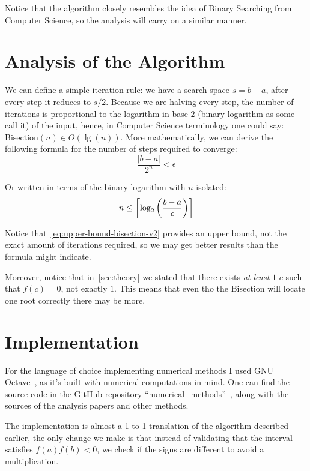 \documentclass[12pt]{article}
\theoremstyle{plain}
\DeclarePairedDelimiter\ceil{\lceil}{\rceil}
\begin{document}
Notice that the algorithm closely resembles the idea of Binary Searching from Computer Science, so the analysis will carry on a similar manner.

\section{Analysis of the Algorithm}\label{sec:analysis}

We can define a simple iteration rule: we have a search space $s = b - a$, after every step it reduces to $s/2$. Because we are halving every step, the number of iterations is proportional to the logarithm in base $2$ (binary logarithm as some call it) of the input, hence, in Computer Science terminology one could say: $\text{Bisection}(n) \in O(\lg(n))$. More mathematically, we can derive the following formula for the number of steps required to converge:
\begin{equation}\label{eq:upper-bound-bisection-v1}
  \frac{|b - a|}{2^n} < \epsilon
\end{equation}

Or written in terms of the binary logarithm with $n$ isolated:
\begin{equation}\label{eq:upper-bound-bisection-v2}
  n \le \ceil*{\log_2\left(\frac{b - a}{\epsilon}\right)}
\end{equation}

Notice that~\eqref{eq:upper-bound-bisection-v2} provides an upper bound, not the exact amount of iterations required, so we may get better results than the formula might indicate.

Moreover, notice that in~\ref{sec:theory} we stated that there exists \emph{at least} $1$ $c$ such that $f(c) = 0$, not exactly $1$. This means that even tho the Bisection will locate one root correctly there may be more.

\section{Implementation}\label{sec:implementation}

For the language of choice implementing numerical methods I used GNU Octave~\cite{octave}, as it's built with numerical computations in mind. One can find the source code in the GitHub repository ``numerical\_methods''~\cite{repo}, along with the sources of the analysis papers and other methods.

The implementation is almost a 1 to 1 translation of the algorithm described earlier, the only change we make is that instead of validating that the interval satisfies $f(a)f(b) < 0$, we check if the signs are different to avoid a multiplication.
\end{document}
